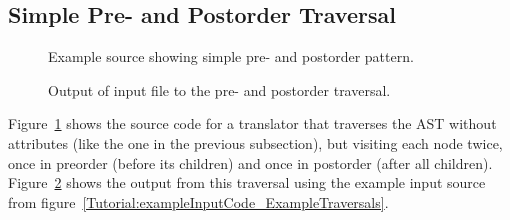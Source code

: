 \subsection{Simple Pre- and Postorder Traversal}

\begin{figure}[!h]
{\indent
{\mySmallFontSize

\begin{latexonly}
   
\end{latexonly}

\begin{htmlonly}
   
\end{htmlonly}

}
}
\caption{Example source showing simple pre- and postorder pattern.}
\label{Tutorial:examplePrePostTraversal}
\end{figure}


\begin{figure}[!h]
{\indent
{\mySmallFontSize


\begin{latexonly}
   
\end{latexonly}

\begin{htmlonly}
   
\end{htmlonly}

}
}
\caption{Output of input file to the pre- and postorder traversal.}
\label{Tutorial:exampleOutput_PrePostTraversal}
\end{figure}

Figure~\ref{Tutorial:examplePrePostTraversal} shows the source code for a
translator that traverses the AST without attributes (like the one in the
previous subsection), but visiting each node twice, once in preorder (before
its children) and once in postorder (after all children).
Figure~\ref{Tutorial:exampleOutput_PrePostTraversal} shows the 
output from this traversal using the example input source from 
figure~\ref{Tutorial:exampleInputCode_ExampleTraversals}.


